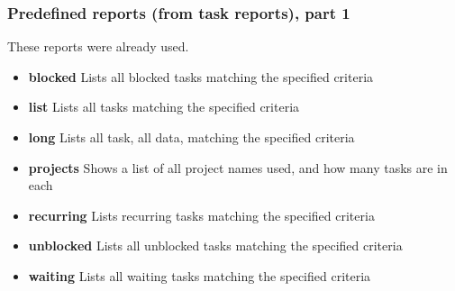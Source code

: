 \documentclass[t,handout]{beamer}
\begin{document}
\begin{frame}[fragile]\frametitle{Predefined reports (from task reports), part 1}
    These reports were already used.

    \begin{itemize}
        \item \textbf{blocked}          Lists all blocked tasks matching the specified criteria
        \item \textbf{list}             Lists all tasks matching the specified criteria
        \item \textbf{long}             Lists all task, all data, matching the specified criteria
        \item \textbf{projects}         Shows a list of all project names used, and how many tasks are in each
        \item \textbf{recurring}        Lists recurring tasks matching the specified criteria
        \item \textbf{unblocked}        Lists all unblocked tasks matching the specified criteria
        \item \textbf{waiting}          Lists all waiting tasks matching the specified criteria
    \end{itemize}
\end{frame}
\end{document}
